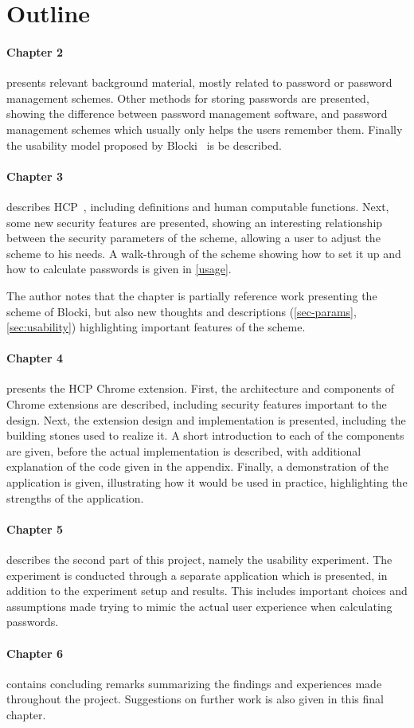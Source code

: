 \section{Outline}
\paragraph{Chapter 2} presents relevant background material, mostly related to password or password management schemes. Other methods for storing passwords are presented, showing the difference between password management software, and password management schemes which usually only helps the users remember them. Finally the usability model proposed by Blocki~\cite{Blocki2014} is be described.
\paragraph{Chapter 3} describes HCP~\cite{hcp-blocki}, including definitions and human computable functions. Next, some new security features are presented, showing an interesting relationship between the security parameters of the scheme, allowing a user to adjust the scheme to his needs. A walk-through of the scheme showing how to set it up and how to calculate passwords is given in \autoref{usage}.
\par The author notes that the chapter is partially reference work presenting the scheme of Blocki, but also new thoughts and descriptions (\autoref{sec-params}, \autoref{sec:usability}) highlighting important features of the scheme. 
\paragraph{Chapter 4} presents the HCP Chrome extension. First, the architecture and components of Chrome extensions are described, including security features important to the design. Next, the extension design and implementation is presented, including the building stones used to realize it. A short introduction to each of the components are given, before the actual implementation is described, with additional explanation of the code given in the appendix. Finally, a demonstration of the application is given, illustrating how it would be used in practice, highlighting the strengths of the application.
\paragraph{Chapter 5} describes the second part of this project, namely the usability experiment. The experiment is conducted through a separate application which is presented, in addition to the experiment setup and results. This includes important choices and assumptions made trying to mimic the actual user experience when calculating passwords.
\paragraph{Chapter 6} contains concluding remarks summarizing the findings and experiences made throughout the project. Suggestions on further work is also given in this final chapter.


